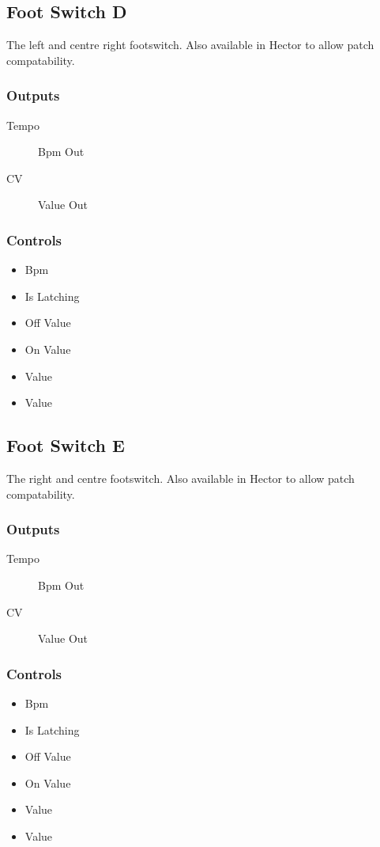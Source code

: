 \subsection{Foot Switch D}

The left and centre right footswitch. Also available in Hector to allow patch compatability.



\subsubsection{Outputs}
\begin{description}
\item [Tempo] Bpm Out
\item [CV] Value Out
\end{description}

\subsubsection{Controls}
\begin{itemize}
\item Bpm
\item Is Latching
\item Off Value
\item On Value
\item Value
\item Value
\end{itemize}

\subsection{Foot Switch E}

The right and centre footswitch. Also available in Hector to allow patch compatability.



\subsubsection{Outputs}
\begin{description}
\item [Tempo] Bpm Out
\item [CV] Value Out
\end{description}

\subsubsection{Controls}
\begin{itemize}
\item Bpm
\item Is Latching
\item Off Value
\item On Value
\item Value
\item Value
\end{itemize}

